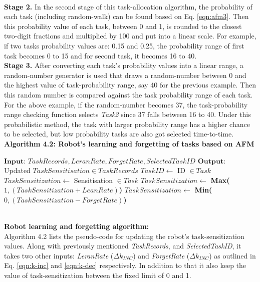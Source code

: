\vspace{-3mm} 
\HRule\\
\textbf{Stage 2.} In the second stage of this task-allocation algorithm, the probability of each task (including random-walk) can be found based on Eq. \ref{eqn:afm3}. Then this probability value of each task, between 0 and 1, is rounded to the closest two-digit fractions and multiplied by 100 and put into a linear scale. For example, if two tasks probability values are: 0.15 and  0.25, the probability range of first  task becomes 0 to 15 and for second task, it becomes 16 to 40.\\
\textbf{Stage 3.} After converting each task's probability values into a linear range,  a random-number generator is used that draws a random-number between 0 and the highest value of task-probability range, say 40 for the previous example. Then this random number is compared against the task probability range of each task. For the above example, if the random-number becomes 37, the task-probability range checking function selects \textit{Task2} since 37 falls between 16 to 40. Under this probabilistic method, the task with larger probability range has a  higher chance to be selected, but low probability tasks are also got selected time-to-time.
\newline
\textbf{Algorithm 4.2: Robot's learning and forgetting of tasks based on AFM}
\vspace{-3mm}
\newline
\HRule
\begin{algorithmic}[1]
\begin{small}
\label{alg:update-sz}
\State $\textbf{Input: }  TaskRecords, LeranRate, ForgetRate, SelectedTaskID$
\State $\textbf{Output: }$ Updated $TaskSensitisation \in TaskRecords$
\State $ TaskID \gets  $ ID $\in Task$
\State $ TaskSensitization \gets  $   Sensitisation $ \in Task$
\State $ TaskSensitization \gets $ \textbf{Max(}$1, (TaskSensitization + LeanRate)$\textbf{)}
\Else
\State $ TaskSensitization \gets $ \textbf{Min(}$0, (TaskSensitization - ForgetRate)$\textbf{)}
\EndIf
\EndFor
\end{small}
\end{algorithmic}
\vspace{-3mm} 
\HRule\\
\textbf{Robot learning and forgetting algorithm:}\\
Algorithm 4.2 lists the pseudo-code for updating the robot's task-sensitization values. Along with previously mentioned \textit{TaskRecords}, and  \textit{SelectedTaskID}, it takes two other inputs: \textit{LeranRate} ($\Delta k_{INC} $) and \textit{ForgetRate} ($\Delta k_{INC} $) as outlined in Eq. \ref{eqn:k-inc} and \ref{eqn:k-dec} respectively.  In addition to that it also keep the value of task-sensitization between the fixed limit of 0 and 1.
